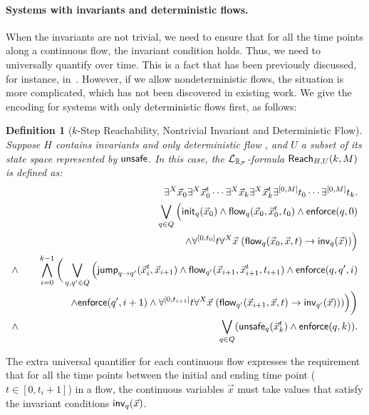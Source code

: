 \documentclass[journal]{IEEEtran}
\newtheorem{definition}{Definition}
\newcommand{\enforce}{\mathsf{enforce}}
\begin{document}
\paragraph{Systems with invariants and deterministic flows.} When the invariants are not trivial, we need to ensure that for all the time points along a continuous flow, the invariant condition holds. Thus, we need to universally quantify over time. This is a fact that has been previously discussed, for instance, in~\cite{DBLP:conf/fmcad/CimattiMT12}. However, if we allow nondeterministic flows, the situation is more complicated, which has not been discovered in existing work. We give the encoding for systems with only deterministic flows first, as follows:
\begin{definition}[$k$-Step Reachability, Nontrivial Invariant and Deterministic Flow]\label{br2}
Suppose $H$ contains invariants and only deterministic flow
, and $U$ a subset of its state space represented by $\mathsf{unsafe}$. In this case, the $\mathcal{L}_{\mathbb{R}_{\mathcal{F}}}$-formula $\mathsf{Reach}_{H,U}(k,M)$ is defined as:
\begin{eqnarray*}
& &\exists^X \vec x_{0} \exists^X\vec x_{0}^t\cdots \exists^X \vec x_{k}\exists^X\vec x_{k}^t \exists^{[0,M]}t_0\cdots \exists^{[0,M]}t_k.\\
& &\bigvee_{q\in Q} \Big(\init_{q}(\vec x_{0})\wedge \flow_{q}(\vec x_{0}, \vec x_{0}^t, t_0)\wedge \enforce(q,0)\\
& &\hspace{5cm} \wedge \forall^{[0,t_0]}t\forall^X\vec x\;(\flow_{q}(\vec x_{0}, \vec x, t)\rightarrow \inv_{q}(\vec x))\Big) \\
\wedge & &\bigwedge_{i=0}^{k-1}\bigg( \bigvee_{q, q'\in Q} \Big(\jump_{q\rightarrow q'}(\vec
x_{i}^t, \vec x_{i+1})\wedge \flow_{q'}(\vec x_{i+1}, \vec x_{i+1}^t, t_{i+1})\wedge \enforce(q,q',i)\\
& & \hspace{1.5cm}\wedge\enforce(q',i+1)\wedge \forall^{[0,t_{i+1}]}t\forall^X\vec x\;(\flow_{q'}(\vec x_{i+1}, \vec x,
t)\rightarrow \inv_{q'}(\vec x)) )\Big)\bigg)\\
\wedge & &\bigvee_{q\in Q} (\unsafe_q(\vec x_{k}^t)\wedge \enforce(q,k)).
\end{eqnarray*}
\end{definition}
The extra universal quantifier for each continuous flow expresses the requirement that for all the time points between the initial and ending time point ($t\in[0,t_i+1]$) in a flow, the continuous variables $\vec x$ must take values that satisfy the invariant conditions $\mathsf{inv}_q(\vec x)$.
\end{document}
